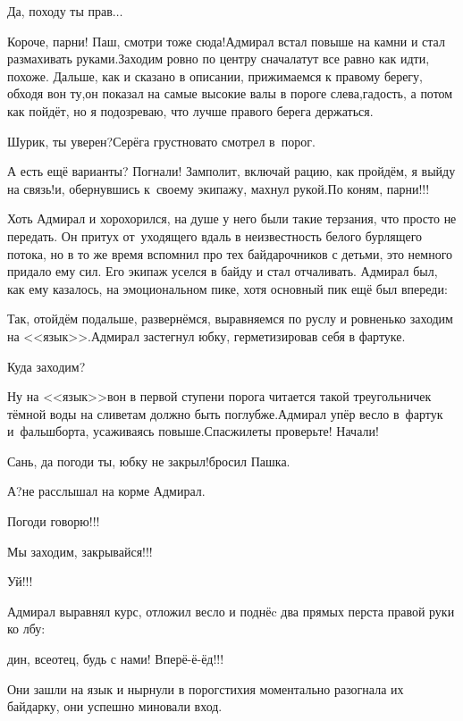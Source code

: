 \diagdash Да, походу ты прав$\ldots$

\diagdash Короче, парни! Паш, смотри тоже сюда!\mdash Адмирал встал повыше на камни и стал размахивать руками.\mdash Заходим ровно по центру сначала\mdash тут все равно как идти, похоже. Дальше, как и сказано в описании, прижимаемся к правому берегу, обходя вон ту,\mdash он показал на самые высокие валы в пороге слева,\mdash гадость, а потом как пойдёт, но я подозреваю, что лучше правого берега держаться.

\diagdash Шурик, ты уверен?\mdash Серёга грустновато смотрел в~порог.

\diagdash А есть ещё варианты? Погнали! Замполит, включай рацию, как пройдём, я выйду на связь!\mdash и, обернувшись к~своему экипажу, махнул рукой.\mdash По коням, парни!!!

Хоть Адмирал и хорохорился, на душе у него были такие терзания, что просто не передать. Он притух от~уходящего вдаль в неизвестность белого бурлящего потока, но в то же время вспомнил про тех байдарочников с детьми, это немного придало ему сил. Его экипаж уселся в байду и стал отчаливать. Адмирал был, как ему казалось, на эмоциональном пике, хотя основный пик ещё был впереди:

\diagdash Так, отойдём подальше, развернёмся, выравняемся по руслу и ровненько заходим на <<язык>>.\mdash Адмирал застегнул юбку, герметизировав себя в фартуке.

\diagdash Куда заходим?

\diagdash Ну на <<язык>>\mdash вон в первой ступени порога читается такой треугольничек тёмной воды на сливе\mdash там должно быть поглубже.\mdash Адмирал упёр весло в~фартук и~фальшборта, усаживаясь повыше.\mdash Спасжилеты проверьте! Начали!

\diagdash Сань, да погоди ты, юбку не закрыл!\mdash бросил Пашка.

\diagdash А?\mdash не расслышал на корме Адмирал.

\diagdash Погоди говорю!!!

\diagdash Мы заходим, закрывайся!!!

\diagdash Уй!!!

Адмирал выравнял курс, отложил весло и поднёc два прямых перста правой руки ко лбу:

дин, всеотец, будь с нами! Вперё-ё-ёд!!!

Они зашли на язык и нырнули в порог\mdash стихия моментально разогнала их байдарку, они успешно миновали вход.

